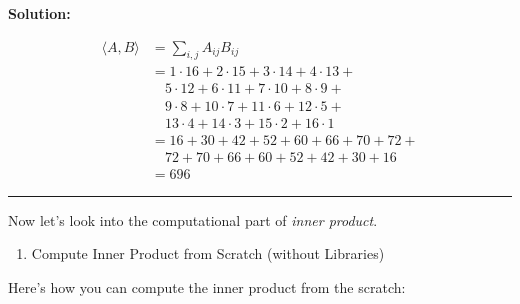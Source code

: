 \documentclass[
  letterpaper,
  DIV=11,
  numbers=noendperiod]{scrreprt}
\providecommand{\tightlist}{%
  \setlength{\itemsep}{0pt}\setlength{\parskip}{0pt}}\usepackage{longtable,booktabs,array}
\theoremstyle{plain}
\theoremstyle{definition}
\theoremstyle{remark}
\begin{document}
\textbf{Solution:}

\begin{align*}
\langle A,B \rangle &= \sum_{i,j} A_{ij} B_{ij} \\
&= 1\cdot16 + 2\cdot15 + 3\cdot14 + 4\cdot13 + \\
&\quad 5\cdot12 + 6\cdot11 + 7\cdot10 + 8\cdot9 + \\
&\quad 9\cdot8 + 10\cdot7 + 11\cdot6 + 12\cdot5 + \\
&\quad 13\cdot4 + 14\cdot3 + 15\cdot2 + 16\cdot1 \\
&= 16 + 30 + 42 + 52 + 60 + 66 + 70 + 72 + \\
&\quad 72 + 70 + 66 + 60 + 52 + 42 + 30 + 16 \\
&= 696
\end{align*}

\begin{center}\rule{0.5\linewidth}{0.5pt}\end{center}

Now let's look into the computational part of \emph{inner product}.

\begin{enumerate}
\def\labelenumi{\arabic{enumi}.}
\tightlist
\item
  Compute Inner Product from Scratch (without Libraries)
\end{enumerate}

Here's how you can compute the inner product from the scratch:
\end{document}
